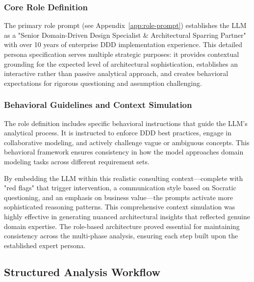 \subsubsection{Core Role Definition}
The primary role prompt (see Appendix~\ref{app:role-prompt}) establishes the LLM as a "Senior Domain-Driven Design Specialist \& Architectural Sparring Partner" with over 10 years of enterprise DDD implementation experience. This detailed persona specification serves multiple strategic purposes: it provides contextual grounding for the expected level of architectural sophistication, establishes an interactive rather than passive analytical approach, and creates behavioral expectations for rigorous questioning and assumption challenging.

\subsubsection{Behavioral Guidelines and Context Simulation}
The role definition includes specific behavioral instructions that guide the LLM's analytical process. It is instructed to enforce DDD best practices, engage in collaborative modeling, and actively challenge vague or ambiguous concepts. This behavioral framework ensures consistency in how the model approaches domain modeling tasks across different requirement sets.

By embedding the LLM within this realistic consulting context—complete with "red flags" that trigger intervention, a communication style based on Socratic questioning, and an emphasis on business value—the prompts activate more sophisticated reasoning patterns. This comprehensive context simulation was highly effective in generating nuanced architectural insights that reflected genuine domain expertise. The role-based architecture proved essential for maintaining consistency across the multi-phase analysis, ensuring each step built upon the established expert persona.

\subsection{Structured Analysis Workflow}

